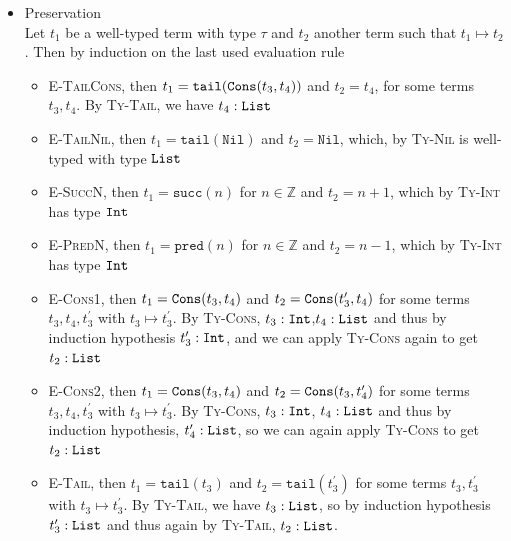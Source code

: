 \documentclass{article}
\newcommand{\tyint}{\ensuremath\mathtt{Int}}
\newcommand{\listint}{\ensuremath\mathtt{List}}
\newcommand{\cons}[2]{\ensuremath\mathtt{Cons}(#1,#2)}
\begin{document}
\begin{enumerate}
\begin{itemize}
\begin{itemize}
\begin{enumerate}
  \end{enumerate}
\item \textsc{Ty-Succ}, then $t=\mathtt{succ}(t_1)$ for some term $t_1:\tyint$. If $t_1$ is a value, it has to be a number $n\in\mathtt{Z}$ and $t\mapsto n+1$. Otherwise, by induction hypothesis $t_1\mapsto t_1^{\prime}$ for some term $t_1^{\prime}$, and by \textsc{E-Succ}, $t\mapsto \mathtt{succ}(t_1^{\prime}$.
\item \textsc{Ty-Pred}, analogous to \textsc{Ty-Succ}, but with $+1$ replaced by $-1$
\end{itemize}
\item Preservation\\
  Let $t_1$ be a well-typed term with type $\tau$ and $t_2$ another term such that $t_1\mapsto t_2$. Then by induction on the last used evaluation rule
    \begin{itemize}
      \item \textsc{E-TailCons}, then $t_1=\mathtt{tail}(\cons{t_3}{t_4})$ and $t_2=t_4$, for some terms $t_3,t_4$. By \textsc{Ty-Tail}, we have $t_4:\listint$
      \item \textsc{E-TailNil}, then $t_1=\mathtt{tail}(\mathtt{Nil})$ and $t_2=\mathtt{Nil}$, which, by \textsc{Ty-Nil} is well-typed with type $\listint$
      \item \textsc{E-SuccN}, then $t_1 = \mathtt{succ}(n)$ for $n\in\mathbb{Z}$ and $t_2=n+1$, which by \textsc{Ty-Int} has type $\tyint$
      \item \textsc{E-PredN}, then  $t_1= \mathtt{pred}(n)$ for $n\in\mathbb{Z}$ and $t_2=n-1$, which by \textsc{Ty-Int} has type $\tyint$
      \item \textsc{E-Cons1}, then $t_1 = \cons{t_3}{t_4}$ and $t_2=\cons{t_3^{\prime}}{t_4}$ for some terms $t_3,t_4,t_3^{\prime}$ with $t_3 \mapsto t_3^{\prime}$. By \textsc{Ty-Cons}, $t_3:\tyint$,$t_4:\listint$ and thus by induction hypothesis $t_3^{\prime}:\tyint$, and we can apply \textsc{Ty-Cons} again to get $t_2:\listint$
      \item \textsc{E-Cons2}, then $t_1 = \cons{t_3}{t_4}$ and $t_2=\cons{t_3}{t_4^{\prime}}$ for some terms $t_3,t_4,t_3^{\prime}$ with $t_3 \mapsto t_3^{\prime}$. By \textsc{Ty-Cons}, $t_3:\tyint$, $t_4:\listint$ and thus by induction hypothesis, $t_4^{\prime}:\listint$, so we can again apply \textsc{Ty-Cons} to get $t_2:\listint$
      \item \textsc{E-Tail}, then $t_1 = \mathtt{tail}(t_3)$ and $t_2=\mathtt{tail}(t_3^{\prime})$ for some terms $t_3,t_3^{\prime}$ with $t_3\mapsto t_3^{\prime}$. By \textsc{Ty-Tail}, we have $t_3:\listint$, so by induction hypothesis $t_3^{\prime}:\listint$ and thus again by \textsc{Ty-Tail}, $t_2:\listint$.

\end{itemize}
\end{itemize}
\end{enumerate}
\end{document}

